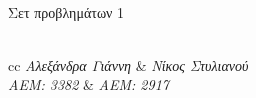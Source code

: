 \documentclass[a4paper,12pt]{article}
\begin{document}
\begin{titlepage}
		\HRule \\[0.5cm]
		{ \huge Σετ προβλημάτων 1}\\[0.4cm] %
		\HRule \\[1.8cm]
		
		
		
		\vspace*{1cm}
		\begin{minipage}{\textwidth}
			\centering
			\begin{tblr}{cc}
				 \emph{{\LARGE Αλεξάνδρα Γιάννη}} & \emph{{\LARGE Νίκος Στυλιανού}} \\ [3mm]
				 \emph{{\LARGE AEM: 3382}} & \emph{{\LARGE AEM: 2917}} \\
			\end{tblr}
		\end{minipage}\\[2.5cm]
		
		
		
		
		
	\end{titlepage}
	
	
	
\end{document}
